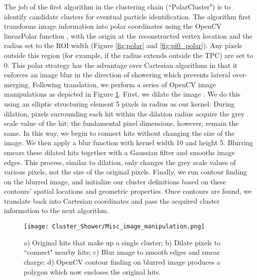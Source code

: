 \documentclass{article}
\begin{document}
\par The job of the first algorithm in the clustering chain (``PolarCluster") is to identify candidate clusters for eventual particle identification. The algorithm first transforms image information into polar coordinates using the OpenCV linearPolar function \cite{bib:linearPolar}, with the origin at the reconstructed vertex location and the radius set to the ROI width (Figure \ref{fig:polar} and \ref{fig:pi0_polar}). Any pixels outside this region (for example, if the radius extends outside the TPC) are set to 0. This polar strategy has the advantage over Cartesian algorithms in that it enforces an image blur in the direction of showering which prevents lateral over-merging. Following translation, we perform a series of OpenCV image manipulations as depicted in Figure \ref{fig:sbc}. First, we dilate the image \cite{bib:dilate}. We do this using an elliptic structuring element \cite{bib:structuringElement} 5 pixels in radius as our kernel. During dilation, pixels surrounding each hit within the dilation radius acquire the grey scale value of the hit; the fundamental pixel dimensions, however, remain the same. In this way, we begin to connect hits without changing the size of the image. We then apply a blur function \cite{bib:blur} with kernel width 10 and height 5. Blurring smears these dilated hits together with a Gaussian filter and smooths image edges. This process, similar to dilation, only changes the grey scale values of various pixels, not the size of the original pixels. Finally, we run contour finding \cite{bib:contourFinding} on the blurred image, and initialize our cluster definitions based on these contours' spatial locations and geometric properties.  Once contours are found, we translate back into Cartesian coordinates and pass the acquired cluster information to the next algorithm.


\begin{figure}[H]
\centering
\texttt{[image: Cluster\_Shower/Misc\_image\_manipulation.png]}
\caption{ a) Original hits that make up a single cluster; b) Dilate pixels to ``connect" nearby hits; c) Blur image to smooth edges and smear charge; d) OpenCV contour finding on blurred image produces a polygon which now encloses the original hits.}
\label{fig:sbc}
\end{figure}
\end{document}

